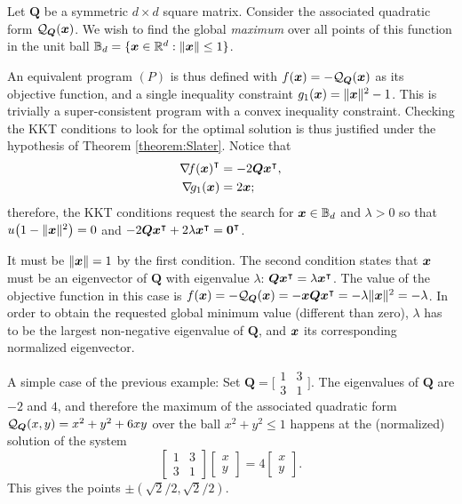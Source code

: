 \begin{example}
Let $\boldsymbol{Q}$ be a symmetric $d \times d$ square matrix.  Consider the associated quadratic form $\mathcal{Q}_{\boldsymbol{Q}}(\boldsymbol{x})$.  We wish to find the global \emph{maximum} over all points of this function in the unit ball $\mathbb{B}_d = \{ \boldsymbol{x} \in \mathbb{R}^d : \lVert \boldsymbol{x} \rVert \leq 1 \}$.

An equivalent program $(P)$ is thus defined with $f(\boldsymbol{x}) = -\mathcal{Q}_{\boldsymbol{Q}}(\boldsymbol{x})$ as its objective function, and a single inequality constraint $g_1(\boldsymbol{x}) = \lVert \boldsymbol{x} \rVert^2-1$. This is trivially a super-consistent program with a convex inequality constraint.  Checking the KKT conditions to look for the optimal solution is thus justified under the hypothesis of Theorem \ref{theorem:Slater}.  Notice that
\begin{align*}
{\mathop{\nabla\! {f}}(\boldsymbol{x})}^\intercal &= -2 \boldsymbol{Q} {\boldsymbol{x}}^\intercal, \\
\mathop{\nabla\! {g_1}}(\boldsymbol{x}) &= 2\boldsymbol{x};
\end{align*}
therefore, the KKT conditions request the search for $\boldsymbol{x} \in \mathbb{B}_d$ and $\lambda >0$ so that $u\big(1-\lVert \boldsymbol{x} \rVert^2 \big)=0$ and $-2\boldsymbol{Q} {\boldsymbol{x}}^\intercal + 2\lambda{\boldsymbol{x}}^\intercal = {\boldsymbol{0}}^\intercal$.  

It must be $\lVert \boldsymbol{x} \rVert=1$ by the first condition.  The second condition states that $\boldsymbol{x}$ must be an eigenvector of $\boldsymbol{Q}$ with eigenvalue $\lambda$: $\boldsymbol{Q} {\boldsymbol{x}}^\intercal = \lambda {\boldsymbol{x}}^\intercal$.  The value of the objective function in this case is $f(\boldsymbol{x}) = -\mathcal{Q}_{\boldsymbol{Q}}(\boldsymbol{x}) = -\boldsymbol{x} \boldsymbol{Q} {\boldsymbol{x}}^\intercal = -\lambda \lVert \boldsymbol{x} \rVert^2= -\lambda$.  In order to obtain the requested global minimum value (different than zero), $\lambda$ has to be the largest non-negative eigenvalue of $\boldsymbol{Q}$, and $\boldsymbol{x}$ its corresponding normalized eigenvector.
\end{example}

\begin{example}
A simple case of the previous example: Set $\boldsymbol{Q} = \big[ \begin{smallmatrix} 1 & 3 \\ 3 & 1 \end{smallmatrix}\big]$.  The eigenvalues of $\boldsymbol{Q}$ are $-2$ and $4$, and therefore the maximum of the associated quadratic form $\mathcal{Q}_{\boldsymbol{Q}}(x,y) = x^2+y^2+6xy$ over the ball $x^2+y^2\leq 1$ happens at the (normalized) solution of the system
\begin{equation*}
\begin{bmatrix} 1 & 3 \\ 3 & 1 \end{bmatrix} \begin{bmatrix} x \\ y \end{bmatrix} = 4\begin{bmatrix} x \\ y \end{bmatrix}.
\end{equation*}
This gives the points $\pm(\sqrt{2}/2, \sqrt{2}/2)$.
\end{example}

